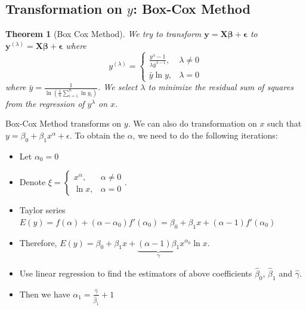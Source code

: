 \documentclass[11pt]{article}
\newtheorem{theorem}{Theorem}[section]
\theoremstyle{definition}
\begin{document}
\subsection{Transformation on {$y$}: Box-Cox Method}
\begin{theorem}[Box Cox Method]
\normalfont We try to transform $\bm{y}=\bm{X\beta}+\bm{\epsilon}$ to $\bm{y}^{(\lambda)}=\bm{X\beta}+\bm{\epsilon}$ where
\[
y^{(\lambda)}=\begin{cases}
\frac{y^\lambda-1}{\lambda \bar{y}^{\lambda-1}}, & \lambda\neq 0\\
\bar{y}\ln y, & \lambda = 0\end{cases}
\]
where $\bar{y}=\frac{1}{\ln(\frac{1}{n}\sum_{i=1}^n\ln y_i)}$.
We select $\lambda$ to minimize the residual sum of squares from the regression of $y^\lambda$ on $x$.
\end{theorem}
Box-Cox Method transforms on $y$. We can also do transformation on $x$ such that $y=\beta_0+\beta_1x^\alpha+\epsilon$. To obtain the $\alpha$, we need to do the following iterations:
\begin{itemize}
  \item Let $\alpha_0 = 0$
  \item Denote $\xi=\begin{cases} x^\alpha, & \alpha \neq 0\\ \ln x, & \alpha = 0\end{cases}$.
  \item Taylor series $E(y)=f(\alpha)+(\alpha - \alpha_0)f'(\alpha_0) = \beta_0+\beta_1x+(\alpha-1)f'(\alpha_0)$
  \item Therefore, $E(y)=\beta_0+\beta_1x+\underbrace{(\alpha-1)\beta_1}_{\gamma}x^{\alpha_0}\ln x$.
  \item Use linear regression to find the estimators of above coefficients $\hat{\beta}_0$, $\hat{\beta}_1$ and $\hat{\gamma}$.
  \item Then we have $\alpha_1=\frac{\hat{\gamma}}{\hat{\beta}_1}+1$
\end{itemize}
\end{document}
